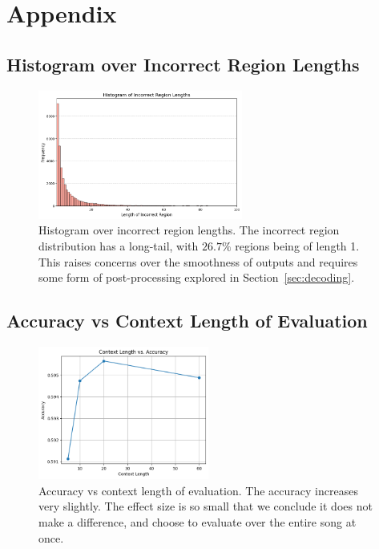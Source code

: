 
\appendix

\chapter{Appendix}

\section{Histogram over Incorrect Region Lengths}\label{app:histogram_over_region_lengths}

\begin{figure}[h]
    \centering
    \includegraphics[width=0.6\textwidth]{figures/incorrect_region_histogram.png}
    \caption{Histogram over incorrect region lengths. The incorrect region distribution has a long-tail, with $26.7\%$ regions being of length 1. This raises concerns over the smoothness of outputs and requires some form of post-processing explored in Section~\ref{sec:decoding}.}
    \label{fig:histogram_over_region_lengths}
\end{figure}

\newpage

\section{Accuracy vs Context Length of Evaluation}\label{app:accuracy_vs_context_length}

\begin{figure}[h]
    \centering
    \includegraphics[width=0.5\textwidth]{figures/context_length_vs_accuracy.png}
    \caption{Accuracy vs context length of evaluation. The accuracy increases very slightly. The effect size is so small that we conclude it does not make a difference, and choose to evaluate over the entire song at once.}
    \label{fig:accuracy_vs_context_length}
\end{figure}

